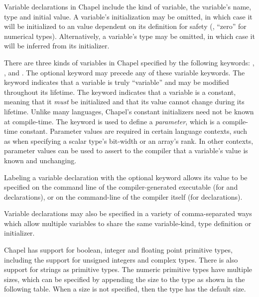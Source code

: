 Variable declarations in Chapel include the kind of variable, the variable's
name, type and initial value.  A variable's initialization may be omitted, 
in which case it will be initialized to an value dependent on its definition for 
safety (\eg, ``zero'' for numerical types).  Alternatively, a variable's type 
may be omitted, in which case it will be inferred from its
initializer.

There are three kinds of variables in Chapel specified by the following 
keywords:  , ,
and .  The optional keyword  may precede
any of these variable keywords.  The  keyword indicates that a
variable is truly ``variable'' and may be modified throughout its
lifetime.  The  keyword indicates that a variable is a
constant, meaning that it \emph{must} be initialized and that its
value cannot change during its lifetime.  Unlike many languages,
Chapel's constant initializers need not be known at compile-time.  The
 keyword is used to define a \emph{parameter}, which is a
compile-time constant.  Parameter values are
required in certain language contexts, such as when specifying a
scalar type's bit-width or an array's rank.  In other contexts,
parameter values can be used to assert to the compiler that a
variable's value is known and unchanging.

Labeling a variable declaration with the optional 
keyword allows its value to be specified on the command line of the
compiler-generated executable (for  and
 declarations), or on the command-line of the
compiler itself (for  declarations).

Variable declarations may also be specified in a variety of
comma-separated ways which allow multiple variables to share the same
variable-kind, type definition or initializer.  

Chapel has support for boolean, integer and floating point primitive types,
including the support for unsigned integers and complex types.  There is
also support for strings as primitive types.  The numeric primitive types
have multiple sizes, which can be specified by appending the size to the
type as shown in the following table.  When a size is not specified, then
the type has the default size.


